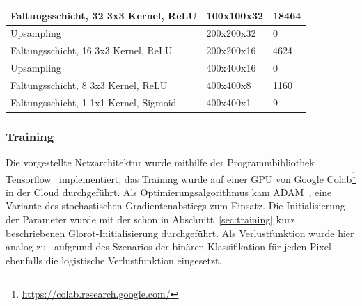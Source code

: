 \begin{table}
\begin{tabular}{|l|l|l|}
        \hline

        Faltungsschicht, 32 3x3 Kernel, ReLU   & 100x100x32                  & 18464                     \\

        \hline

        Upsampling                             & 200x200x32                  & 0                         \\

        \hline

        Faltungsschicht, 16 3x3 Kernel, ReLU   & 200x200x16                  & 4624                      \\

        \hline

        Upsampling                             & 400x400x16                  & 0                         \\

        \hline

        Faltungsschicht, 8 3x3 Kernel, ReLU    & 400x400x8                   & 1160                      \\

        \hline

        Faltungsschicht, 1 1x1 Kernel, Sigmoid & 400x400x1                   & 9                         \\

        \hline
    \end{tabular}
\end{table}

\subsubsection{Training}

Die vorgestellte Netzarchitektur wurde mithilfe der
Programmbibliothek Tensorflow~\cite{tensorflow2015-whitepaper}
implementiert,
das Training wurde auf einer GPU von Google
Colab\footnote{\url{https://colab.research.google.com/}} in der Cloud
durchgef\"uhrt.
Als Optimierungsalgorithmus kam ADAM~\cite{adam},
eine Variante des stochastischen Gradientenabstiegs zum Einsatz.
Die Initialisierung der Parameter wurde mit der schon in
Abschnitt~\ref{sec:training} kurz beschriebenen Glorot-Initialisierung
durchgef\"uhrt.
Als Verlustfunktion wurde hier analog zu~\cite{image-segmentation} aufgrund
des Szenarios der bin\"aren Klassifikation f\"ur jeden Pixel
ebenfalls die logistische Verlustfunktion eingesetzt.

